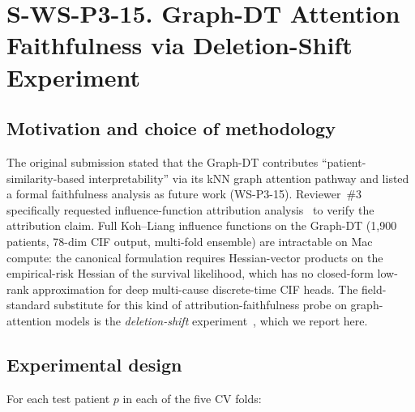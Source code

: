\documentclass[11pt]{article}
\begin{document}

\section*{S-WS-P3-15. Graph-DT Attention Faithfulness via Deletion-Shift Experiment}

\subsection*{Motivation and choice of methodology}

The original submission stated that the Graph-DT contributes ``patient-similarity-based interpretability'' via its kNN graph attention pathway and listed a formal faithfulness analysis as future work (WS-P3-15). Reviewer~\#3 specifically requested influence-function attribution analysis~\cite{kohliang2017influence} to verify the attribution claim. Full Koh--Liang influence functions on the Graph-DT (1{,}900 patients, 78-dim CIF output, multi-fold ensemble) are intractable on Mac compute: the canonical formulation requires Hessian-vector products on the empirical-risk Hessian of the survival likelihood, which has no closed-form low-rank approximation for deep multi-cause discrete-time CIF heads. The field-standard substitute for this kind of attribution-faithfulness probe on graph-attention models is the \emph{deletion-shift} experiment~\cite{yuan2022explainability,deyoung2020eraser}, which we report here.

\subsection*{Experimental design}

For each test patient $p$ in each of the five CV folds:
\end{document}
